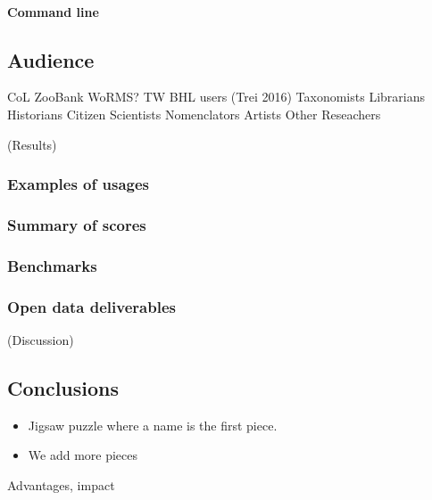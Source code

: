 \documentclass[
]{article}
\providecommand{\tightlist}{%
  \setlength{\itemsep}{0pt}\setlength{\parskip}{0pt}}
\begin{document}
\hypertarget{command-line}{%
\paragraph{Command line}\label{command-line}}

\hypertarget{audience}{%
\subsection{Audience}\label{audience}}

CoL ZooBank WoRMS? TW BHL users (Trei 2016) Taxonomists Librarians
Historians Citizen Scientists Nomenclators Artists Other Reseachers

(Results)

\hypertarget{examples-of-usages}{%
\subsubsection{Examples of usages}\label{examples-of-usages}}

\hypertarget{summary-of-scores}{%
\subsubsection{Summary of scores}\label{summary-of-scores}}

\hypertarget{benchmarks}{%
\subsubsection{Benchmarks}\label{benchmarks}}

\hypertarget{open-data-deliverables}{%
\subsubsection{Open data deliverables}\label{open-data-deliverables}}

(Discussion)

\hypertarget{conclusions}{%
\subsection{Conclusions}\label{conclusions}}

\begin{itemize}
\tightlist
\item
  Jigsaw puzzle where a name is the first piece.
\item
  We add more pieces
\end{itemize}

Advantages, impact
\end{document}
